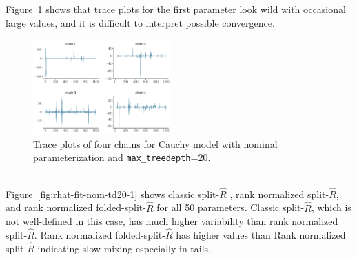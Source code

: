\documentclass[american,]{article}
\begin{document}
Figure~\ref{fig:trace-fit-nom-td20-1} shows that trace plots for the first
parameter look wild with occasional large values, and it is difficult
to interpret possible convergence.
\begin{figure}[tp]
  \centering
  \includegraphics[width=0.47\textwidth]{graphics/trace-fit-nom-td20-1.pdf}
  \caption{Trace plots of four chains for Cauchy model with nominal parameterization and \texttt{max\_treedepth}=20.\\~}
  \label{fig:trace-fit-nom-td20-1}
\end{figure}
%
Figure~\ref{fig:rhat-fit-nom-td20-1} shows classic split-\(\widehat{R}\) ,
rank normalized split-\(\widehat{R}\), and rank normalized
folded-split-\(\widehat{R}\) for all 50 parameters. Classic split-\(\widehat{R}\), which is
not well-defined in this case, has much higher variability than rank
normalized split-\(\widehat{R}\).  Rank normalized
folded-split-\(\widehat{R}\) has higher values than Rank normalized
split-\(\widehat{R}\) indicating slow mixing especially in tails.
\end{document}
